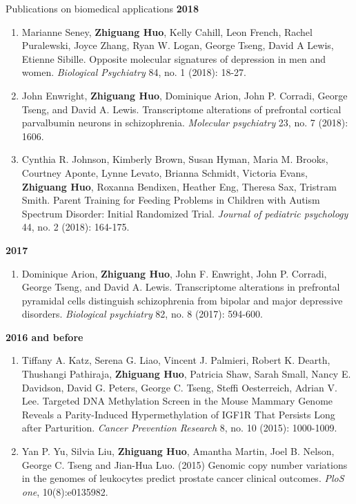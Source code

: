\documentclass{resume} %
\begin{document}
\begin{rSection}{Publications on biomedical applications}
\textbf{2018}
\begin{enumerate}[noitemsep,topsep=0pt, resume]

\item Marianne Seney,  {\bf Zhiguang Huo},  Kelly Cahill, Leon French, Rachel Puralewski, Joyce Zhang, Ryan W. Logan, George Tseng, David A Lewis, Etienne Sibille. Opposite molecular signatures of depression in men and women. \emph{Biological Psychiatry}  84, no. 1 (2018): 18-27.

\item 
John Enwright, {\bf Zhiguang Huo}, Dominique Arion, John P. Corradi, George Tseng, and David A. Lewis. 
Transcriptome alterations of prefrontal cortical parvalbumin neurons in schizophrenia. 
\emph{Molecular psychiatry} 23, no. 7 (2018): 1606.

\item 
Cynthia R. Johnson, Kimberly Brown, Susan Hyman, Maria M. Brooks, Courtney Aponte, Lynne Levato, Brianna Schmidt,
Victoria Evans, {\bf Zhiguang Huo},  Roxanna Bendixen, Heather Eng, Theresa Sax, Tristram Smith.
Parent Training for Feeding Problems in Children with Autism Spectrum Disorder: Initial Randomized Trial. \emph{Journal of pediatric psychology} 44, no. 2 (2018): 164-175.

\end{enumerate}

\textbf{2017}
\begin{enumerate}[noitemsep,topsep=0pt, resume]

\item  
Dominique Arion, {\bf Zhiguang Huo}, John F. Enwright, John P. Corradi, George Tseng, and David A. Lewis. Transcriptome alterations in prefrontal pyramidal cells distinguish schizophrenia from bipolar and major depressive disorders. \emph{Biological psychiatry} 82, no. 8 (2017): 594-600.

\end{enumerate}



\textbf{2016 and before}
\begin{enumerate}[noitemsep,topsep=0pt,resume]

    \item Tiffany A. Katz, Serena G. Liao, Vincent J. Palmieri, Robert K. Dearth, Thushangi Pathiraja, {\bf Zhiguang Huo}, Patricia Shaw, Sarah Small, Nancy E. Davidson, David G. Peters, George C. Tseng, Steffi Oesterreich, Adrian V. Lee. Targeted DNA Methylation Screen in the Mouse Mammary Genome Reveals a Parity-Induced Hypermethylation of IGF1R That Persists Long after Parturition. \emph{Cancer Prevention Research} 8, no. 10 (2015): 1000-1009.

    \item Yan P. Yu, Silvia Liu, {\bf Zhiguang Huo}, Amantha Martin, Joel B. Nelson, George C. Tseng and Jian-Hua Luo. (2015) Genomic copy number variations in the genomes of leukocytes predict prostate cancer clinical outcomes. \emph{PloS one}, 10(8):e0135982.

\end{enumerate}


\end{rSection}
\end{document}
